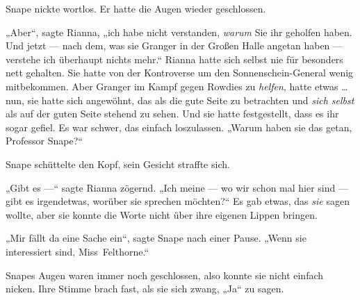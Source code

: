 Snape nickte wortlos. Er hatte die Augen wieder geschlossen.

„Aber“, sagte Rianna, „ich habe nicht verstanden, \emph{warum} Sie ihr geholfen haben. Und jetzt — nach dem, was sie Granger in der Großen Halle angetan haben — verstehe ich überhaupt nichts mehr.“ Rianna hatte sich selbst nie für besonders nett gehalten. Sie hatte von der Kontroverse um den Sonnenschein-General wenig mitbekommen. Aber Granger im Kampf gegen Rowdies zu \emph{helfen}, hatte etwas … nun, sie hatte sich angewöhnt, das als die gute Seite zu betrachten und \emph{sich selbst} als auf der guten Seite stehend zu sehen. Und sie hatte festgestellt, dass es ihr sogar gefiel. Es war schwer, das einfach loszulassen.
„Warum haben sie das getan, Professor Snape?“

Snape schüttelte den Kopf, sein Gesicht straffte sich.

„Gibt es —“ sagte Rianna zögernd.
„Ich meine — wo wir schon mal hier sind — gibt es irgendetwas, worüber sie sprechen möchten?“ Es gab etwas, das \emph{sie} sagen wollte, aber sie konnte die Worte nicht über ihre eigenen Lippen bringen.

„Mir fällt da eine Sache ein“, sagte Snape nach einer Pause.
„Wenn sie interessiert sind, Miss~Felthorne.“

Snapes Augen waren immer noch geschlossen, also konnte sie nicht einfach nicken. Ihre Stimme brach fast, als sie sich zwang,
„Ja“ zu sagen.

